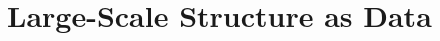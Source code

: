 \chapter{Large-Scale Structure as Data}\label{ch:11}
\providecommand{\PoisL}{}\renewcommand{\PoisL}{600}
\providecommand{\PoisN}{}\renewcommand{\PoisN}{96}
\providecommand{\PoisNsim}{}\renewcommand{\PoisNsim}{10}
\providecommand{\PoisBias}{}\renewcommand{\PoisBias}{1.5}
\providecommand{\PoisShotA}{}\renewcommand{\PoisShotA}{0.987}
\providecommand{\PoisShotB}{}\renewcommand{\PoisShotB}{0.981}
\providecommand{\PoisShotC}{}\renewcommand{\PoisShotC}{1.000}
\providecommand{\PoisUnif}{}\renewcommand{\PoisUnif}{0.982}
\providecommand{\PoisDiffC}{}\renewcommand{\PoisDiffC}{0.990}
\providecommand{\PoisDiffB}{}\renewcommand{\PoisDiffB}{1.002}
\providecommand{\PoisCicMeanSmall}{}\renewcommand{\PoisCicMeanSmall}{0.244}
\providecommand{\PoisCicFanoSmall}{}\renewcommand{\PoisCicFanoSmall}{2.170}
\providecommand{\PoisCicPredSmall}{}\renewcommand{\PoisCicPredSmall}{2.173}
\providecommand{\PoisCicMeanBig}{}\renewcommand{\PoisCicMeanBig}{125.1}
\providecommand{\PoisCicFanoBig}{}\renewcommand{\PoisCicFanoBig}{19.59}
\providecommand{\PoisCicPredBig}{}\renewcommand{\PoisCicPredBig}{19.62}
\providecommand{\PoisClip}{}\renewcommand{\PoisClip}{1.78}
\providecommand{\XiNsim}{}\renewcommand{\XiNsim}{300}
\providecommand{\XiNsimPer}{}\renewcommand{\XiNsimPer}{150}
\providecommand{\XiNbar}{}\renewcommand{\XiNbar}{0.012}
\providecommand{\XiNg}{}\renewcommand{\XiNg}{5379}
\providecommand{\XiNr}{}\renewcommand{\XiNr}{26896}
\providecommand{\XiArea}{}\renewcommand{\XiArea}{448}
\providecommand{\XiBar}{}\renewcommand{\XiBar}{0.0016}
\providecommand{\XiRbig}{}\renewcommand{\XiRbig}{100}
\providecommand{\XiTrueBig}{}\renewcommand{\XiTrueBig}{-0.0089}
\providecommand{\XiRmid}{}\renewcommand{\XiRmid}{30}
\providecommand{\XiSdNatBig}{}\renewcommand{\XiSdNatBig}{0.0374}
\providecommand{\XiSdDPBig}{}\renewcommand{\XiSdDPBig}{0.0260}
\providecommand{\XiSdHamBig}{}\renewcommand{\XiSdHamBig}{0.0200}
\providecommand{\XiSdLSBig}{}\renewcommand{\XiSdLSBig}{0.0201}
\providecommand{\XiSdPoisBig}{}\renewcommand{\XiSdPoisBig}{0.0025}
\providecommand{\XiRatioNatBig}{}\renewcommand{\XiRatioNatBig}{1.87}
\providecommand{\XiRatioDPBig}{}\renewcommand{\XiRatioDPBig}{1.29}
\providecommand{\XiRatioHamBig}{}\renewcommand{\XiRatioHamBig}{0.99}
\providecommand{\XiRatioNatMid}{}\renewcommand{\XiRatioNatMid}{1.02}
\providecommand{\XiRatioDPMid}{}\renewcommand{\XiRatioDPMid}{1.00}
\providecommand{\XiPerRatioNatBig}{}\renewcommand{\XiPerRatioNatBig}{0.93}
\providecommand{\XiPerRatioDPBig}{}\renewcommand{\XiPerRatioDPBig}{0.95}
